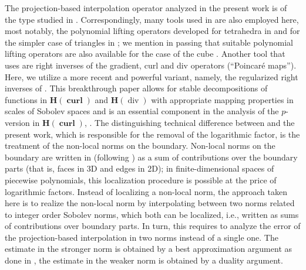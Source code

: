 \documentclass{article}
\begin{document}
The projection-based interpolation operator analyzed in the present work is of the type studied 
in \cite{demkowicz08}. Correspondingly, many tools used in \cite{demkowicz08} are also employed here, 
most notably, the polynomial lifting operators developed for tetrahedra in 
\cite{demkowicz-gopalakrishnan-schoeberl-I,demkowicz-gopalakrishnan-schoeberl-II,demkowicz-gopalakrishnan-schoeberl-III}
and for the simpler case of triangles in 
\cite{ainsworth-demkowicz09}; we mention in passing that suitable polynomial lifting operators are also 
available for the case of the cube \cite{costabel-dauge-demkowicz07}. 
Another tool that \cite{demkowicz08} uses are right inverses of the gradient, curl and div operators 
(``Poincar\'e maps''). Here, we utilize a more recent and powerful variant, namely, the regularized right inverses 
of \cite{costabel-mcintosh10}. This breakthrough paper \cite{costabel-mcintosh10} allows for stable decompositions of functions 
in ${\mathbf H}(\operatorname{\mathbf{curl}})$ 
and ${\mathbf H}(\operatorname{div})$ with appropriate mapping properties 
in scales of Sobolev spaces and is an essential component in the analysis of the $p$-version in ${\mathbf H}(\operatorname{\mathbf{curl}})$, 
\cite{bespalov-heuer09, hiptmair08,boffi-costabel-dauge-demkowicz-hiptmair11}. The distinguishing
technical difference between \cite{demkowicz08} and the present work, which is responsible for the removal 
of the logarithmic factor, is the treatment of the non-local norms on the boundary. 
Non-local norms on the boundary are written in \cite{demkowicz08} (following \cite{demkowicz-buffa05}) 
as a sum of contributions over the boundary parts (that is, faces in 3D and edges in 2D); 
in finite-dimensional spaces of piecewise polynomials, this localization procedure is possible at the price 
of logarithmic factors. Instead of localizing a non-local norm, the approach taken here is to 
realize the non-local norm by interpolating between two norms related to integer order Sobolev norms, which 
both can be localized, i.e., written as sums of contributions over boundary parts. In turn, this requires to analyze the 
error of the projection-based interpolation in two norms instead of a single one. 
The estimate in the stronger norm is obtained by a best approximation argument as done in \cite{demkowicz08}, 
the estimate in the weaker norm is obtained by a duality argument. 
\end{document}
